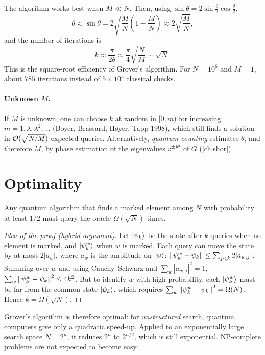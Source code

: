 The algorithm works best when $M\ll N$. Then, using $\sin\theta=2\sin\frac\theta2\cos\frac\theta2$,
\begin{equation}
  \theta\approx\sin\theta=2\sqrt{\frac MN\left(1-\frac MN\right)}\approx2\sqrt{\frac MN},
\end{equation}
and the number of iterations is
\begin{equation}
  k\approx\frac\pi{2\theta}\approx\frac\pi4\sqrt{\frac NM}\sim\sqrt N.
\end{equation}
This is the square-root efficiency of Grover's algorithm. For $N=10^6$ and $M=1$, about $785$ iterations instead of $5\times10^5$ classical checks.

\paragraph{Unknown $M$.} If $M$ is unknown, one can choose $k$ at random in $[0,m)$ for increasing $m=1,\lambda,\lambda^2,\dots$ (Boyer, Brassard, Høyer, Tapp 1998), which still finds a solution in
$\mathcal O(\sqrt{N/M})$ expected queries. Alternatively, \emph{quantum counting} estimates $\theta$, and therefore $M$, by phase estimation of the eigenvalues $\mathrm e^{\pm\mathrm i\theta}$ of $G$ (\cref{ch:shor}).

\section{Optimality}
\begin{theorem}
Any quantum algorithm that finds a marked element among $N$ with probability at least $1/2$ must query the oracle $\Omega(\sqrt N)$ times.
\end{theorem}
\begin{proof}[Idea of the proof (hybrid argument)]
Let $\left|\psi_k\right\rangle$ be the state after $k$ queries when no element is marked, and $\left|\psi_k^w\right\rangle$ when $w$ is marked. Each query can move the state by at most $2|a_w|$, where $a_w$ is the amplitude on
$\left|w\right\rangle$: $\left\|\psi_k^w-\psi_k\right\|\le\sum_{j<k}2|a_{w,j}|$. Summing over $w$ and using Cauchy--Schwarz and $\sum_w|a_{w,j}|^2=1$, $\sum_w\left\|\psi_k^w-\psi_k\right\|^2\le4k^2$. But to identify $w$ with high
probability, each $\left|\psi_k^w\right\rangle$ must be far from the common state $\left|\psi_k\right\rangle$, which requires $\sum_w\left\|\psi_k^w-\psi_k\right\|^2=\Omega(N)$. Hence $k=\Omega(\sqrt N)$.
\end{proof}
Grover's algorithm is therefore optimal: for \emph{unstructured} search, quantum computers give only a quadratic speed-up. Applied to an exponentially large search space $N=2^n$, it reduces $2^n$ to $2^{n/2}$,
which is still exponential. NP-complete problems are not expected to become easy.

